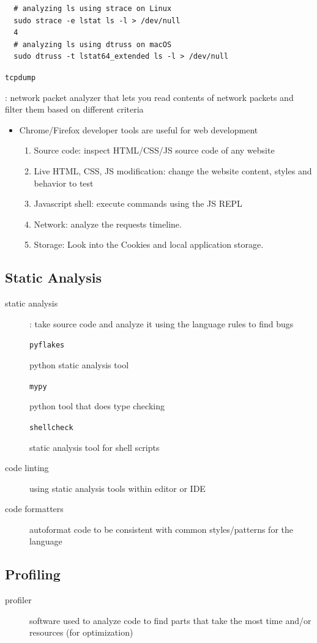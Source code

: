 \documentclass[letterpaper,12pt]{article}
\newcommand*{\lstitem}[1]{
  \setbox0\hbox{\lstinline{#1}}
  \item[\usebox0]
}
\begin{document}
\begin{lstlisting}
  # analyzing ls using strace on Linux
  sudo strace -e lstat ls -l > /dev/null
  4
  # analyzing ls using dtruss on macOS
  sudo dtruss -t lstat64_extended ls -l > /dev/null
\end{lstlisting}

\begin{description}
 \lstitem{tcpdump}: network packet analyzer that lets you read contents of network packets and filter them based on different criteria
\end{description}

\begin{itemize}
 \item Chrome/Firefox developer tools are useful for web development
       \begin{enumerate}
        \item Source code: inspect HTML/CSS/JS source code of any website
        \item Live HTML, CSS, JS modification: change the website content, styles and behavior to test
        \item Javascript shell: execute commands using the JS REPL
        \item Network: analyze the requests timeline.
        \item Storage: Look into the Cookies and local application storage.
       \end{enumerate}
\end{itemize}

\subsection{Static Analysis}
\begin{description}
 \item[static analysis]: take source code and analyze it using the language rules to find bugs
       \lstitem{pyflakes} python static analysis tool
       \lstitem{mypy} python tool that does type checking
       \lstitem{shellcheck} static analysis tool for shell scripts
 \item[code linting] using static analysis tools within editor or IDE
 \item[code formatters] autoformat code to be consistent with common styles/patterns for the language
\end{description}

\subsection{Profiling}
\begin{description}
 \item[profiler] software used to analyze code to find parts that take the most time and/or resources (for optimization)
\end{description}
\end{document}
